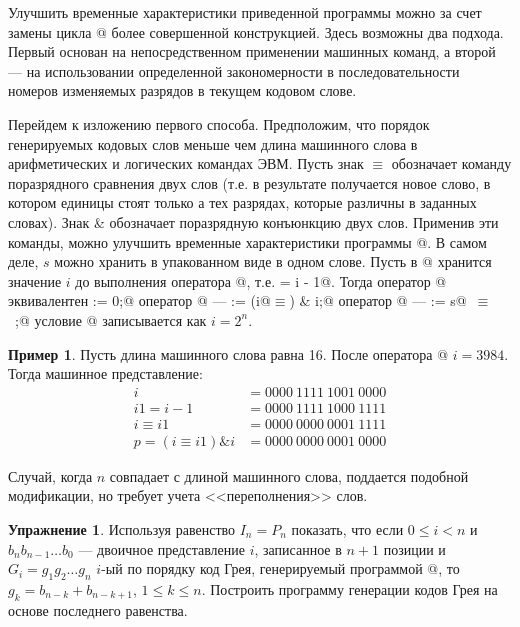 \documentclass[12pt,a4paper]{article}
\theoremstyle{plain}
\theoremstyle{definition}
\newtheorem*{task}{Упражнение}
\newtheorem*{example}{Пример}
\theoremstyle{remark}
\begin{document}
Улучшить временные характеристики приведенной программы можно за счет замены цикла @ более совершенной конструкцией. Здесь возможны два подхода. Первый основан на непосредственном применении машинных команд, а второй --- на использовании определенной закономерности в последовательности номеров изменяемых разрядов в текущем кодовом слове.

Перейдем к изложению первого способа. Предположим, что порядок генерируемых кодовых слов меньше чем длина машинного слова в арифметических и логических командах ЭВМ. Пусть знак $\equiv$ обозначает команду поразрядного сравнения двух слов (т.е. в результате получается новое слово, в котором единицы стоят только а тех разрядах, которые различны в заданных словах). Знак \& обозначает поразрядную конъюнкцию двух слов. Применив эти команды, можно улучшить временные характеристики программы @. В самом деле, $s$ можно хранить в упакованном виде в одном слове. Пусть в @ хранится значение $i$ до выполнения оператора @, т.е.  = i - 1@. Тогда оператор @ эквивалентен \verb@s := 0;@ оператор @ --- \verb@p := (i@$\equiv$) & i;@ оператор @ --- \verb@s := s@~$\equiv$~\verb@p;@ условие @ записывается как $i = 2^n$.

\begin{example}
Пусть длина машинного слова равна 16. После оператора @ $i=3984$. Тогда машинное представление:
\[
\begin{aligned}
i &= 0000\: 1111\: 1001\: 0000 \\
i1 = i-1 &= 0000\: 1111\: 1000\: 1111 \\
i \equiv i1 &= 0000\: 0000\: 0001\: 1111 \\
p=(i \equiv i1) \& i &= 0000\: 0000\: 0001\: 0000
\end{aligned}
\]
\end{example}

Случай, когда $n$ совпадает с длиной машинного слова, поддается подобной модификации, но требует учета <<переполнения>> слов.

\begin{task}
Используя равенство $I_n = P_n$ показать, что если $0\le i<n$ и $b_n b_{n-1}\ldots b_0$ --- двоичное представление $i$, записанное в $n+1$ позиции и $G_i = g_1 g_2 \ldots g_n$ $i$-ый по порядку код Грея, генерируемый программой @, то $g_k = b_{n-k}+b_{n-k+1}$, $1\le k\le n$. Построить программу генерации кодов Грея на основе последнего равенства.
\end{task}
\end{document}
